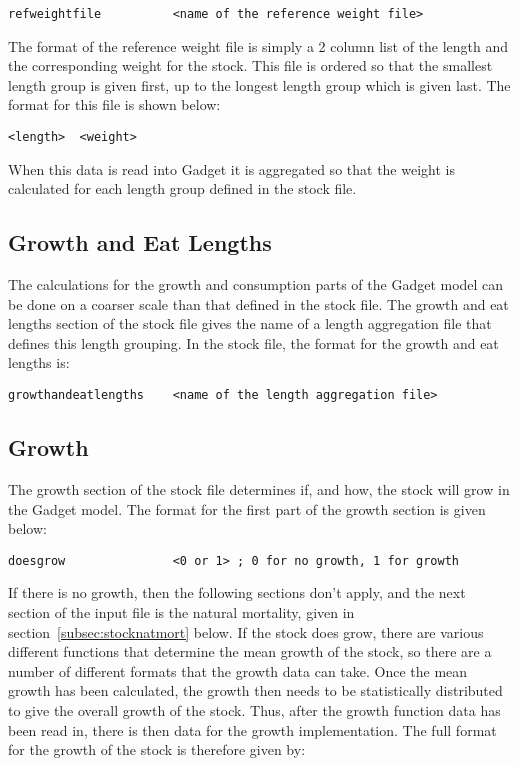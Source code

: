 \documentclass [a4paper, 10pt]{book}
\begin{document}
{\small\begin{verbatim}
refweightfile          <name of the reference weight file>
\end{verbatim}}

The format of the reference weight file is simply a 2 column list of the length and the corresponding weight for the stock.  This file is ordered so that the smallest length group is given first, up to the longest length group which is given last.  The format for this file is shown below:

{\small\begin{verbatim}
<length>  <weight>
\end{verbatim}}

When this data is read into Gadget it is aggregated so that the weight is calculated for each length group defined in the stock file.

\subsection{Growth and Eat Lengths}\label{subsec:stockgrowthlength}
The calculations for the growth and consumption parts of the Gadget model can be done on a coarser scale than that defined in the stock file.  The growth and eat lengths section of the stock file gives the name of a length aggregation file that defines this length grouping.  In the stock file, the format for the growth and eat lengths is:

{\small\begin{verbatim}
growthandeatlengths    <name of the length aggregation file>
\end{verbatim}}

\subsection{Growth}\label{subsec:stockgrowth}
The growth section of the stock file determines if, and how, the stock will grow in the Gadget model.  The format for the first part of the growth section is given below:

{\small\begin{verbatim}
doesgrow               <0 or 1> ; 0 for no growth, 1 for growth
\end{verbatim}}

If there is no growth, then the following sections don't apply, and the next section of the input file is the natural mortality, given in section~\ref{subsec:stocknatmort} below.  If the stock does grow, there are various different functions that determine the mean growth of the stock, so there are a number of different formats that the growth data can take.  Once the mean growth has been calculated, the growth then needs to be statistically distributed to give the overall growth of the stock.  Thus, after the growth function data has been read in, there is then data for the growth implementation.  The full format for the growth of the stock is therefore given by:
\end{document}
